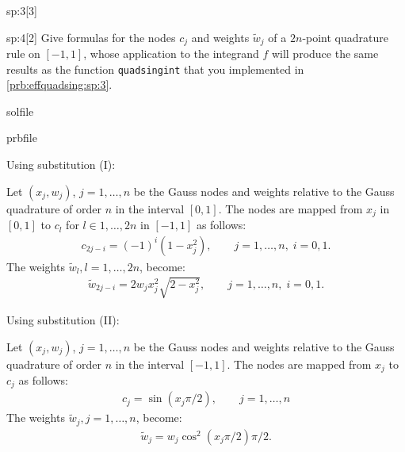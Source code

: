 \begin{samproblem}
\begin{subproblem}{sp:3}[3]
\end{subproblem}


\begin{subproblem}{sp:4}[2]
  Give formulas for the nodes $c_j$ and weights $\tilde{w}_j$ of a $2n$-point quadrature rule on $[-1,1]$, 
  whose application to the integrand $f$ will produce the same results as the function \verb|quadsingint| that you implemented in 
  \ref{prb:effquadsing:sp:3}.
  
  \begin{samwriteprbpart}{solfile}
    \begin{writeverbatim}{prbfile}
      \begin{samsolution}
        Using substitution (I):
         
        Let $(x_j, w_j)$, $j=1,\dots,n$ be the Gauss nodes and weights relative to the Gauss quadrature of order $n$ in the interval $[0,1]$. 
        The nodes are mapped from $x_j$ in $[0,1]$ to $c_l$ for $l \in 1,\dots,2n$ in $[-1,1]$ as follows:
        \begin{align*}
          c_{2j-i}  = (-1)^i (1-x_j^2),\qquad j=1,\dots,n,\;i=0,1.  
        \end{align*}
        The weights $\tilde{w}_{l}, l = 1,\dots,2n$, become:
        \begin{align*}
          \tilde{w}_{2j-i} = 2 w_j x_j^2 \sqrt{2 - x_j^2},\qquad j=1,\dots,n,\;i=0,1.
        \end{align*}
    
        Using substitution (II):

        Let $(x_j, w_j)$, $j=1,\dots,n$ be the Gauss nodes and weights relative to the Gauss quadrature of order $n$ in the interval $[-1,1]$.  
        The nodes are mapped from $x_j$ to $c_j$  as follows:
        \begin{align*}
          c_j = \sin(x_j  \pi / 2),\qquad j=1,\dots,n
        \end{align*}
        The weights $\tilde{w}_{j}, j = 1,\dots,n$, become:
        \begin{align*}
          \tilde{w}_{j} = w_j \cos^2(x_j  \pi / 2) \pi / 2.
        \end{align*}
      \end{samsolution}
    \end{writeverbatim}
  \end{samwriteprbpart}
\end{subproblem}




\end{samproblem}
